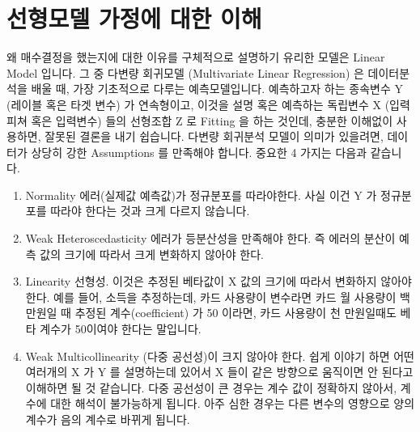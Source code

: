 \documentclass[letterpaper,10pt,english]{jupyterBook}
\begin{document}
\section{선형모델 가정에 대한 이해}
\label{\detokenize{chapter5/5.2.4_LM_Assumptions:id1}}\label{\detokenize{chapter5/5.2.4_LM_Assumptions::doc}}
\sphinxAtStartPar
왜 매수결정을 했는지에 대한 이유를 구체적으로 설명하기 유리한 모델은 Linear Model 입니다. 그 중 다변량 회귀모델 (Multivariate Linear Regression) 은 데이터분석을 배울 때, 가장 기초적으로 다루는 예측모델입니다. 예측하고자 하는 종속변수 Y (레이블 혹은 타겟 변수) 가 연속형이고, 이것을 설명 혹은 예측하는 독립변수 X (입력피쳐 혹은 입력변수) 들의 선형조합 Z 로 Fitting 을 하는 것인데, 충분한 이해없이 사용하면, 잘못된 결론을 내기 쉽습니다. 다변량 회귀분석 모델이 의미가 있을려면, 데이터가 상당히 강한 Assumptions 를 만족해야 합니다. 중요한 4 가지는 다음과 같습니다.
\begin{enumerate}
%
\item {} 
\sphinxAtStartPar
Normality \sphinxhyphen{} 에러(실제값 \sphinxhyphen{} 예측값)가 정규분포를 따라야한다. 사실 이건 Y 가 정규분포를 따라야 한다는 것과 크게 다르지 않습니다.

\item {} 
\sphinxAtStartPar
Weak Heteroscedasticity \sphinxhyphen{} 에러가 등분산성을 만족해야 한다. 즉 에러의 분산이 예측 값의 크기에 따라서 크게 변화하지 않아야 한다.

\item {} 
\sphinxAtStartPar
Linearity \sphinxhyphen{} 선형성. 이것은 추정된 베타값이 X 값의 크기에 따라서 변화하지 않아야 한다. 예를 들어, 소득을 추정하는데, 카드 사용량이 변수라면 카드 월 사용량이 백만원일 때 추정된 계수(coefficient) 가 50 이라면, 카드 사용량이 천 만원일때도 베타 계수가 50이여야 한다는 말입니다.

\item {} 
\sphinxAtStartPar
Weak Multicollinearity \sphinxhyphen{} (다중 공선성)이 크지 않아야 한다. 쉽게 이야기 하면 어떤 여러개의 X 가 Y 를 설명하는데 있어서 X 들이 같은 방향으로 움직이면 안 된다고 이해하면 될 것 같습니다. 다중 공선성이 큰 경우는 계수 값이 정확하지 않아서, 계수에 대한 해석이 불가능하게 됩니다. 아주 심한 경우는 다른 변수의 영향으로 양의 계수가 음의 계수로 바뀌게 됩니다.

\end{enumerate}
\end{document}
